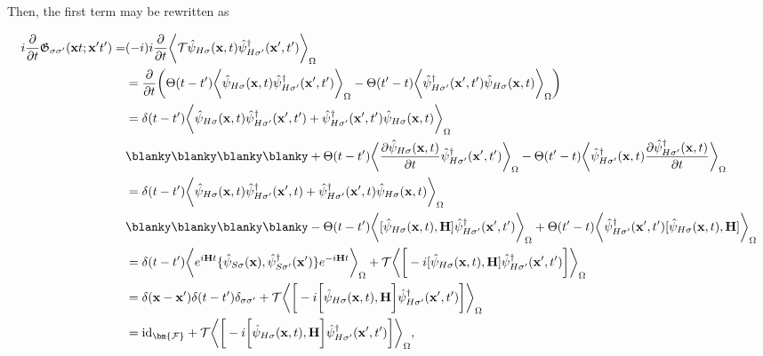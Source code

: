 Then, the first term may be rewritten as 
    
    \begin{equation}
        \begin{split}
            i\frac{\partial}{\partial t} \mathfrak{G}_{\sigma \sigma'}({\bf x} t; {\bf x}' t') = &(-i) i \frac{\partial}{\partial t} \bigg\langle \mathcal{T} \hat{\psi}_{H \sigma}({\bf x}, t) \hat{\psi}^\dagger_{H \sigma'}({\bf x}', t') \bigg \rangle_{\Omega}\\
            &= \frac{\partial}{\partial t} \bigg(\Theta(t-t')\bigg\langle \hat{\psi}_{H \sigma}({\bf x}, t) \hat{\psi}^\dagger_{H \sigma'}({\bf x}', t') \bigg \rangle_{\Omega} -\Theta(t'-t) \bigg\langle\hat{\psi}^\dagger_{H \sigma'}({\bf x}', t')\hat{\psi}_{H \sigma}({\bf x}, t)  \bigg \rangle_{\Omega}  \bigg)\\
            &= \delta(t-t')\bigg\langle \hat{\psi}_{H \sigma}({\bf x}, t) \hat{\psi}^\dagger_{H \sigma'}({\bf x}', t') +  \hat{\psi}^\dagger_{H \sigma'}({\bf x}', t')\hat{\psi}_{H \sigma}({\bf x}, t) \bigg \rangle_{\Omega} \\
            & \blanky \blanky \blanky \blanky+ \Theta(t-t') \bigg\langle \frac{\partial\hat{\psi}_{H \sigma}({\bf x}, t)}{\partial t} \hat{\psi}^\dagger_{H \sigma'}({\bf x}', t') \bigg \rangle_{\Omega} - \Theta(t'-t) \bigg\langle \hat{\psi}^\dagger_{H \sigma'}({\bf x}, t)  \frac{\partial \hat{\psi}^\dagger_{H \sigma'}({\bf x}, t)}{\partial t} \bigg \rangle_{\Omega}\\
            &= \delta(t-t') \bigg\langle \hat{\psi}_{H \sigma}({\bf x}, t) \hat{\psi}^\dagger_{H \sigma'}({\bf x}', t) +  \hat{\psi}^\dagger_{H \sigma'}({\bf x}', t)\hat{\psi}_{H \sigma}({\bf x}, t) \bigg \rangle_{\Omega} \\
            & \blanky \blanky \blanky \blanky
            - \Theta(t-t') \bigg\langle [\hat{\psi}_{H \sigma}({\bf x}, t), {\bf H}] \hat{\psi}^\dagger_{H \sigma'}({\bf x}', t') \bigg \rangle_{\Omega} + \Theta(t'-t) \bigg\langle\hat{\psi}^\dagger_{H \sigma'}({\bf x}', t') [\hat{\psi}_{H \sigma}({\bf x}, t), {\bf H}] \bigg \rangle_{\Omega} \\
            &= \delta(t-t') \bigg\langle e^{i {\bf H} t} \{\hat{\psi}_{S \sigma}({\bf x}), \hat{\psi}^\dagger_{S \sigma'}({\bf x}')\} e^{-i {\bf H} t} \bigg \rangle_{\Omega} + \mathcal{T} \bigg\langle \bigg[-i [\hat{\psi}_{H \sigma}({\bf x}, t), {\bf H}] \hat{\psi}^\dagger_{H \sigma'}({\bf x}', t') \bigg] \bigg \rangle_{\Omega} \\
            &= \delta({\bf x} - {\bf x}') \delta(t-t') \delta_{\sigma \sigma'} + \mathcal{T} \bigg\langle \bigg[-i \bigg[\hat{\psi}_{H \sigma}({\bf x}, t), {\bf H}\bigg] \hat{\psi}^\dagger_{H \sigma'}({\bf x}', t') \bigg] \bigg \rangle_{\Omega} \\
            &= \textnormal{id}_{\bm{\mathcal{F}}} + \mathcal{T} \bigg\langle \bigg[-i \bigg[\hat{\psi}_{H \sigma}({\bf x}, t), {\bf H}\bigg] \hat{\psi}^\dagger_{H \sigma'}({\bf x}', t') \bigg] \bigg \rangle_{\Omega}, 
        \end{split}
    \end{equation}
    

